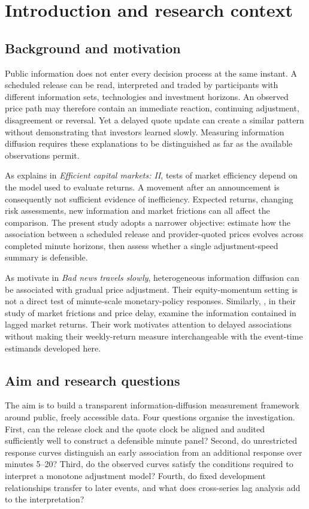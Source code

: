 \section{Introduction and research context}
\subsection{Background and motivation}
Public information does not enter every decision process at the same instant. A scheduled release can be read, interpreted and traded by participants with different information sets, technologies and investment horizons. An observed price path may therefore contain an immediate reaction, continuing adjustment, disagreement or reversal. Yet a delayed quote update can create a similar pattern without demonstrating that investors learned slowly. Measuring information diffusion requires these explanations to be distinguished as far as the available observations permit.

As  explains in \textit{Efficient capital markets: II}, tests of market efficiency depend on the model used to evaluate returns. A movement after an announcement is consequently not sufficient evidence of inefficiency. Expected returns, changing risk assessments, new information and market frictions can all affect the comparison. The present study adopts a narrower objective: estimate how the association between a scheduled release and provider-quoted prices evolves across completed minute horizons, then assess whether a single adjustment-speed summary is defensible.

As  motivate in \textit{Bad news travels slowly}, heterogeneous information diffusion can be associated with gradual price adjustment. Their equity-momentum setting is not a direct test of minute-scale monetary-policy responses. Similarly, , in their study of market frictions and price delay, examine the information contained in lagged market returns. Their work motivates attention to delayed associations without making their weekly-return measure interchangeable with the event-time estimands developed here.

\subsection{Aim and research questions}
The aim is to build a transparent information-diffusion measurement framework around public, freely accessible data. Four questions organise the investigation. First, can the release clock and the quote clock be aligned and audited sufficiently well to construct a defensible minute panel? Second, do unrestricted response curves distinguish an early association from an additional response over minutes 5--20? Third, do the observed curves satisfy the conditions required to interpret a monotone adjustment model? Fourth, do fixed development relationships transfer to later events, and what does cross-series lag analysis add to the interpretation?

